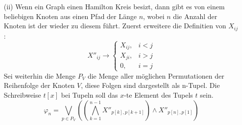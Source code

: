 \documentclass[a4paper,10pt]{article}
\begin{document}
\begin{enumerate}
	\item[(ii)]
%	
%	
%	
Wenn ein Graph einen Hamilton Kreis besizt, dann gibt es von einem beliebigen Knoten aus einen Pfad der Länge $n$, wobei $n$ die Anzahl der Knoten ist der wieder zu diesem führt. Zuerst erweitere die Definitien von $X_{ij}$:
$$X''_{ij} \rightarrow \begin{cases}X_{ij}, & i < j \\ X_{ji}, & i > j \\ 0, & i = j \end{cases} $$
Sei weiterhin die Menge $P_V$ die Menge aller möglichen Permutationen der Reihenfolge der Knoten $V$, diese Folgen sind dargestellt als n-Tupel. Die Schreibweise $t[x]$ bei Tupeln soll das $x$-te Element des Tupels $t$ sein.  
$$\varphi_n =  \bigvee_{p \in P_V}\left(\left(\bigwedge_{k=1}^{n-1} X''_{p[k],p[k+1]} \right) \land X''_{p[n],p[1]} \right)$$

	\end{enumerate}
	
\end{document}
